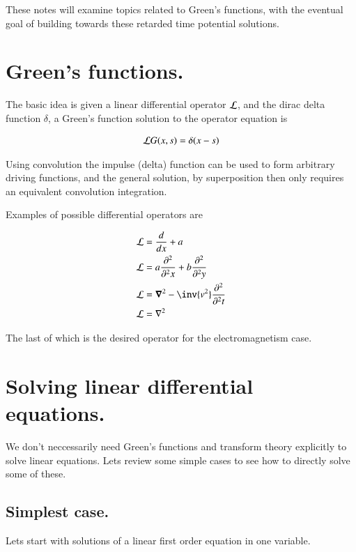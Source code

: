 \documentclass{article}
\begin{document}
These notes will examine topics related to
Green's functions, with the eventual goal of building towards these
retarded time potential solutions.

\section{ Green's functions. }

The basic idea is given a
linear differential operator $\mathcal{L}$, and the dirac delta function $\delta$, a Green's function solution to the operator equation is

\begin{align*}
\mathcal{L} G(x,s) = \delta(x-s)
\end{align*}

Using convolution the impulse (delta) function can be used to form
arbitrary driving functions, and the general solution, by superposition
then only requires an equivalent convolution integration.

Examples of possible differential operators are

\begin{align*}
\LL &= \frac{d}{dx} + a \\
\LL &= a \PDsq{x}{} + b \PDsq{y}{} \\
\LL &= \spacegrad^2 - \inv{v^2}\PDsq{t}{}\\
\LL &= \grad^2 \\
\end{align*}

The last of which is the desired operator for the electromagnetism case.

\section{ Solving linear differential equations. }

We don't neccessarily need Green's functions and transform theory explicitly
to solve linear equations.  Lets review some simple cases to see how to 
directly solve some of these.

\subsection{ Simplest case. }

Lets start with solutions of a linear first order equation in one variable.



\end{document}
